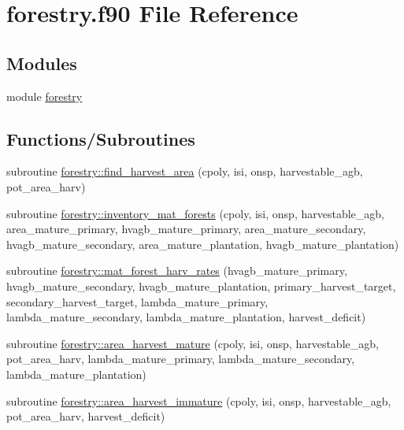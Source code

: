 \hypertarget{forestry_8f90}{}\section{forestry.\+f90 File Reference}
\label{forestry_8f90}
\subsection*{Modules}
\begin{DoxyCompactItemize}
\item 
module \hyperlink{namespaceforestry}{forestry}
\end{DoxyCompactItemize}
\subsection*{Functions/\+Subroutines}
\begin{DoxyCompactItemize}
\item 
subroutine \hyperlink{namespaceforestry_aea994fba45d5e5f01f0abe99d4d1493a}{forestry\+::find\+\_\+harvest\+\_\+area} (cpoly, isi, onsp, harvestable\+\_\+agb, pot\+\_\+area\+\_\+harv)
\item 
subroutine \hyperlink{namespaceforestry_a2b1f9db26882e22b185a2bab3946d958}{forestry\+::inventory\+\_\+mat\+\_\+forests} (cpoly, isi, onsp, harvestable\+\_\+agb, area\+\_\+mature\+\_\+primary, hvagb\+\_\+mature\+\_\+primary, area\+\_\+mature\+\_\+secondary, hvagb\+\_\+mature\+\_\+secondary, area\+\_\+mature\+\_\+plantation, hvagb\+\_\+mature\+\_\+plantation)
\item 
subroutine \hyperlink{namespaceforestry_ab22c7a0e08a2e5a3b26f834e89b900e5}{forestry\+::mat\+\_\+forest\+\_\+harv\+\_\+rates} (hvagb\+\_\+mature\+\_\+primary, hvagb\+\_\+mature\+\_\+secondary, hvagb\+\_\+mature\+\_\+plantation, primary\+\_\+harvest\+\_\+target, secondary\+\_\+harvest\+\_\+target, lambda\+\_\+mature\+\_\+primary, lambda\+\_\+mature\+\_\+secondary, lambda\+\_\+mature\+\_\+plantation, harvest\+\_\+deficit)
\item 
subroutine \hyperlink{namespaceforestry_a96e720b57b0c1a3cbbc518dbc9fe69b6}{forestry\+::area\+\_\+harvest\+\_\+mature} (cpoly, isi, onsp, harvestable\+\_\+agb, pot\+\_\+area\+\_\+harv, lambda\+\_\+mature\+\_\+primary, lambda\+\_\+mature\+\_\+secondary, lambda\+\_\+mature\+\_\+plantation)
\item 
subroutine \hyperlink{namespaceforestry_a27465187b6471294fc19067f73a9a398}{forestry\+::area\+\_\+harvest\+\_\+immature} (cpoly, isi, onsp, harvestable\+\_\+agb, pot\+\_\+area\+\_\+harv, harvest\+\_\+deficit)
\end{DoxyCompactItemize}
